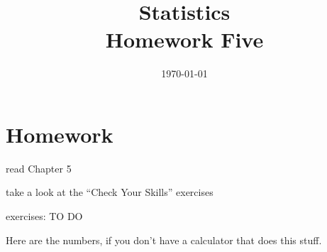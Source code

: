 \documentclass[letterpaper, landscape]{exam}
\title{Statistics \\ Homework Five}
\date{\today}
\author{}
\begin{document}
  \maketitle

  \section{Homework}
    \begin{itemize*}
      \item read Chapter 5 
      \item take a look at the ``Check Your Skills'' exercises
      \item exercises: TO DO
    \end{itemize*}

  \ifprintanswers
  \else
    Here are the numbers, if you don't have a calculator that does this stuff.
\end{document}
